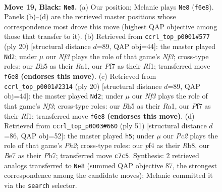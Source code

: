 \documentclass[11pt]{article}
\begin{document}
\clearpage

\begin{figure}[p]\centering
\begin{subfigure}{0.46\textwidth}\centering
\resizebox{\linewidth}{!}{%
\newchessgame
\chessboard[
  setfen={1rr3k1/2p1bppp/p2p1nn1/N6b/2P1PP2/PB6/6P1/RNB1R1K1 b - - 2 19},
  showmover=false,
  pgfstyle=straightmove, color=movearrow, markmove={f6-e8}
]}
\caption{}
\end{subfigure}\hfill
\begin{subfigure}{0.46\textwidth}\centering
\resizebox{\linewidth}{!}{%
\newchessgame
\chessboard[
  setfen={rnb4r/4kppp/p3pn2/1pb5/8/2N1PN2/PP2BPPP/R1B2RK1 w - - 0 11},
  showmover=false,
  pgfstyle=straightmove, color=movearrow, markmove={f3-d2}
]}
\caption{}
\end{subfigure}
\\[4pt]
\begin{subfigure}{0.46\textwidth}\centering
\resizebox{\linewidth}{!}{%
\newchessgame
\chessboard[
  setfen={rnb4r/4kppp/p3pn2/1pb5/8/2N1PN2/PP2BPPP/R1B2RK1 w - - 0 11},
  showmover=false,
  pgfstyle=straightmove, color=movearrow, markmove={f3-d2}
]}
\caption{}
\end{subfigure}\hfill
\begin{subfigure}{0.46\textwidth}\centering
\resizebox{\linewidth}{!}{%
\newchessgame
\chessboard[
  setfen={1r2r1k1/1pp2p1p/pn3np1/3Pb3/8/1P2N1P1/P4PBP/1RBR2K1 b - - 1 26},
  showmover=false,
  pgfstyle=straightmove, color=movearrow, markmove={h7-h5}
]}
\caption{}
\end{subfigure}
\caption{\textbf{Move 19, Black: \texttt{Ne8}.} (a) Our position; Melanie plays \texttt{Ne8} (\texttt{f6e8}). Panels (b)--(d) are the retrieved master positions whose correspondence most drove this move (highest QAP objective among those that transfer to it). (b) Retrieved from \texttt{ccrl\_top\_p0001\#577} (ply 20) [structural distance $d$=89, QAP obj=44]: the master played \texttt{Nd2}; under $\mu$ our \emph{Nf3} plays the role of that game's \emph{Nf3}; cross-type roles: our \emph{B}h5 as their \emph{R}a1, our \emph{P}f7 as their \emph{R}f1; transferred move \texttt{f6e8} \textbf{(endorses this move)}. (c) Retrieved from \texttt{ccrl\_top\_p0001\#2314} (ply 20) [structural distance $d$=89, QAP obj=44]: the master played \texttt{Nd2}; under $\mu$ our \emph{Nf3} plays the role of that game's \emph{Nf3}; cross-type roles: our \emph{B}h5 as their \emph{R}a1, our \emph{P}f7 as their \emph{R}f1; transferred move \texttt{f6e8} \textbf{(endorses this move)}. (d) Retrieved from \texttt{ccrl\_top\_p0003\#660} (ply 51) [structural distance $d$=86, QAP obj=52]: the master played \texttt{h5}; under $\mu$ our \emph{Pc2} plays the role of that game's \emph{Ph2}; cross-type roles: our \emph{p}f4 as their \emph{R}b8, our \emph{B}e7 as their \emph{P}b7; transferred move \texttt{c7c5}. Synthesis: 2 retrieved analogs transferred to \texttt{Ne8} (summed QAP objective 87, the strongest correspondence among the candidate moves); Melanie committed it via the \texttt{search} selector.}
\label{fig:thought-m37}
\end{figure}
\end{document}
